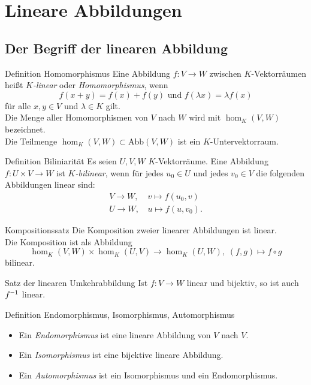 \documentclass[main.tex]{subfiles}
\begin{document}
\section*{Lineare Abbildungen}
\subsection*{Der Begriff der linearen Abbildung}

\begin{karte}{Definition Homomorphismus}
    Eine Abbildung \( f: V \rightarrow W \) zwischen 
    \(K\)-Vektorräumen heißt \textit{\(K\)-linear} oder 
    \textit{Homomorphismus}, wenn 
    \[ f(x+y) = f(x) + f(y) \text{ und } f(\lambda x) = \lambda f(x) \]
    für alle \( x,y\in V \) und \( \lambda \in K \) gilt.\\
    Die Menge aller Homomorphismen von \(V\) nach \(W\) wird mit 
    \( \hom_K(V,W) \) bezeichnet.\\
    Die Teilmenge \( \hom_K(V,W) \subset \mathrm{Abb}(V,W) \) ist ein 
    \(K\)-Untervektorraum.
\end{karte}
\begin{karte}{Definition Biliniarität}
    Es seien \( U,V,W \) \(K\)-Vektorräume. Eine Abbildung 
    \( f: U \times V \rightarrow W \) ist \textit{\(K\)-bilinear}, 
    wenn für jedes \( u_0 \in U \) und jedes \( v_0 \in V \) die 
    folgenden Abbildungen linear sind:
    \begin{align*}
        V \rightarrow W, \,&v\mapsto f(u_0, v)\\
        U \rightarrow W, \,&u\mapsto f(u,v_0).
    \end{align*}
\end{karte}
\begin{karte}{Kompositionssatz}
    Die Komposition zweier linearer Abbildungen ist linear.\\
    Die Komposition ist als Abbildung 
    \[ \hom_K(V,W) \times \hom_K(U,V) \rightarrow 
    \hom_K(U,W),\; (f,g) \mapsto f\circ g \]
    bilinear.
\end{karte}
\begin{karte}{Satz der linearen Umkehrabbildung}
    Ist \( f: V \rightarrow W \) linear und bijektiv, so ist 
    auch \( \inverse{f} \) linear.
\end{karte}
\begin{karte}{Definition Endomorphismus, Isomorphismus, Automorphismus}
    \begin{itemize}
        \item Ein \textit{Endomorphismus} ist eine lineare Abbildung von \(V\) 
        nach \(V\).
        \item Ein \textit{Isomorphismus} ist eine bijektive lineare Abbildung.
        \item Ein \textit{Automorphismus} ist ein Isomorphismus und ein Endomorphismus.
    \end{itemize}
\end{karte}
\end{document}
